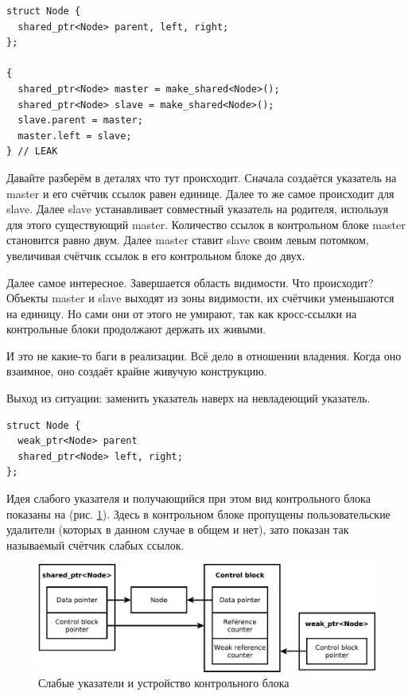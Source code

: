 \documentclass[a4paper,12pt,oneside]{book}
\begin{document}
\begin{lstlisting}
struct Node {
  shared_ptr<Node> parent, left, right;
};

{
  shared_ptr<Node> master = make_shared<Node>();
  shared_ptr<Node> slave = make_shared<Node>();
  slave.parent = master;
  master.left = slave;
} // LEAK
\end{lstlisting}

Давайте разберём в деталях что тут происходит. Сначала создаётся указатель на master и его счётчик ссылок равен единице. Далее то же самое происходит для slave. Далее slave устанавливает совместный указатель на родителя, используя для этого существующий master. Количество ссылок в контрольном блоке master становится равно двум. Далее master ставит slave своим левым потомком, увеличивая счётчик ссылок в его контрольном блоке до двух.

Далее самое интересное. Завершается область видимости. Что происходит? Объекты master и slave выходят из зоны видимости, их счётчики уменьшаются на единицу. Но сами они от этого не умирают, так как кросс-ссылки на контрольные блоки продолжают держать их живыми.

И это не какие-то баги в реализации. Всё дело в отношении владения. Когда оно взаимное, оно создаёт крайне живучую конструкцию.

Выход из ситуации: заменить указатель наверх на невладеющий указатель.

\begin{lstlisting}
struct Node {
  weak_ptr<Node> parent
  shared_ptr<Node> left, right;
};
\end{lstlisting}

Идея слабого указателя и получающийся при этом вид контрольного блока показаны на (рис. \ref{fig:smartptrs-weak-outer}). Здесь в контрольном блоке пропущены пользовательские удалители (которых в данном случае в общем и нет), зато показан так называемый счётчик слабых ссылок.

\begin{figure}[ht]
\centering
\includegraphics[width=1.0\textwidth]{illustrations/smartptrs-weak-outer-crop.pdf}
\caption{Слабые указатели и устройство контрольного блока}
\label{fig:smartptrs-weak-outer}
\end{figure}
\end{document}
